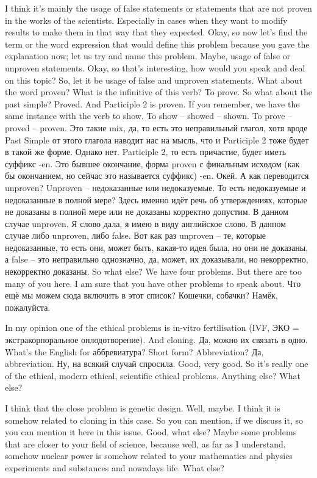 \documentclass[main.tex]{subfiles}
\begin{document}
I think it's mainly the usage of false statements or statements that are not proven in the works of the scientists.
Especially in cases when they want to modify results to make them in that way that they expected.
Okay, so now let's find the term or the word expression that would define this problem because you gave the explanation now; let us try and name this problem.
Maybe, usage of false or unproven  statements.
Okay, so that's interesting, how would you speak and deal on this topic?
So, let it be usage of false and unproven statements.
What about the word proven?
What is the infinitive of this verb?
To prove.
So what about the past simple?
Proved.
And Participle 2 is proven.
If you remember, we have the same instance with the verb to show.
To show -- showed -- shown.
To prove -- proved -- proven.
Это такие mix, да, то есть это неправильный глагол, хотя вроде Past Simple от этого глагола наводит нас на мысль, что и Participle 2 тоже будет в такой же форме.
Однако нет.
Participle 2, то есть причастие, будет иметь суффикс -en.
Это бывшее окончание, форма proven с финальным исходом (как бы окончанием, но сейчас это называется суффикс) -en.
Окей.
А как переводится unproven?
Unproven -- недоказанные или недоказуемые.
То есть недоказуемые и недоказанные в полной мере?
Здесь именно идёт речь об утверждениях, которые не доказаны в полной мере или не доказаны корректно допустим.
В данном случае unproven.
Я слово дала, я имею в виду английское слово.
В данном случае либо unproven, либо false.
Вот как раз unproven -- те, которые недоказанные, то есть они, может быть, какая-то идея была, но они не доказаны, а false -- это неправильно однозначно, да, может, их доказывали, но некорректно, некорректно доказаны.
So what else?
We have four problems.
But there are too many of you here.
I am sure that you have other problems to speak about.
Что ещё мы можем сюда включить в этот список?
Кошечки, собачки?
Намёк, пожалуйста.

In my opinion one of the ethical problems is in-vitro fertilisation (IVF, ЭКО = экстракорпоральное оплодотворение). And cloning.
Да, можно их связать в одно.
What's the English for аббревиатура?
Short form?
Abbreviation?
Да, abbreviation.
Ну, на всякий случай спросила.
Good, very good.
So it's really one of the ethical, modern ethical, scientific ethical problems.
Anything else?
What else?

I think that the close problem is genetic design.
Well, maybe.
I think it is somehow related to cloning in this case.
So you can mention, if we discuss it, so you can mention it here in this issue.
Good, what else?
Maybe some problems that are closer to your field of science, because well, as far as I understand, somehow nuclear power is somehow related to your mathematics and physics experiments and substances and nowadays life.
What else?
\end{document}
